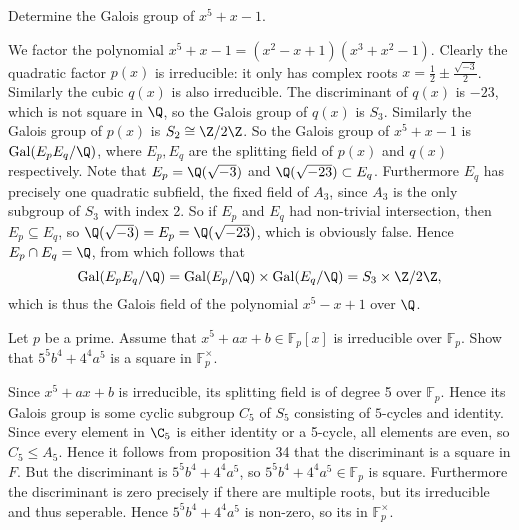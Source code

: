 \documentclass[a4paper, 11pt]{homework}
\newcommand{\F}{\mathbb{F}}
\newcommand{\Gal}{\mathrm{Gal}}
\begin{document}
\begin{questions}
	\question{} Determine the Galois group of \(x^5 + x - 1\).
	\begin{solution}
		We factor the polynomial \(x^5 + x - 1 = (x^2 - x + 1)(x^3 + x^2 - 1)\). Clearly the quadratic factor \(p(x)\)
		is irreducible: it only has complex roots \(x = \frac{1}{2} \pm \frac{\sqrt{-3}}{2}\). Similarly the cubic
		\(q(x)\) is also irreducible. The discriminant of \(q(x)\) is \(-23\), which is not square in \(\Q\), so the
		Galois group of \(q(x)\) is \(S_3\). Similarly the Galois group of \(p(x)\) is \(S_2 \cong \Z/2\Z\). So the
		Galois group of \(x^5 + x - 1\) is \(\Gal(E_pE_q/\Q)\), where \(E_p, E_q\) are the splitting field of \(p(x)\)
		and \(q(x)\) respectively. Note that \(E_p = \Q(\sqrt{-3})\) and \(\Q(\sqrt{-23}) \subset E_q\). Furthermore
		\(E_q\) has precisely one quadratic subfield, the fixed field of \(A_3\), since \(A_3\) is the only subgroup
		of \(S_3\) with index 2. So if \(E_p\) and \(E_q\) had non-trivial intersection, then \(E_p \subseteq E_q\),
		so \(\Q(\sqrt{-3}) = E_p = \Q(\sqrt{-23})\), which is obviously false. Hence \(E_p \cap E_q = \Q\), from which
		follows that
		\[\Gal(E_pE_q/\Q) = \Gal(E_p/\Q) \times \Gal(E_q/\Q) = S_3 \times \Z/2\Z,\]
		which is thus the Galois field of the polynomial \(x^5 - x + 1\) over \(\Q\).
	\end{solution}

	\question{} Let \(p\) be a prime. Assume that \(x^5 + ax + b \in \F_p[x]\) is irreducible over \(\F_p\). Show
	that \(5^5b^4 + 4^4a^5\) is a square in \(\F_p^\times\).
	\begin{solution}
		Since \(x^5 + ax + b\) is irreducible, its splitting field is of degree 5 over \(\F_p\). Hence its Galois
		group is some cyclic subgroup \(C_5\) of \(S_5\) consisting of \(5\)-cycles and identity. Since every element
		in \(\C_5\) is either identity or a 5-cycle, all elements are even, so \(C_5 \le A_5\). Hence it follows from
		proposition 34 that the discriminant is a square in \(F\). But the discriminant is \(5^5b^4+4^4a^5\), so
		\(5^5b^4 + 4^4a^5 \in \F_p\) is square. Furthermore the discriminant is zero precisely if there are multiple
		roots, but its irreducible and thus seperable. Hence \(5^5b^4 + 4^4a^5\) is non-zero, so its in \(\F_p^\times
		\).
	\end{solution}


\end{questions}
\end{document}

